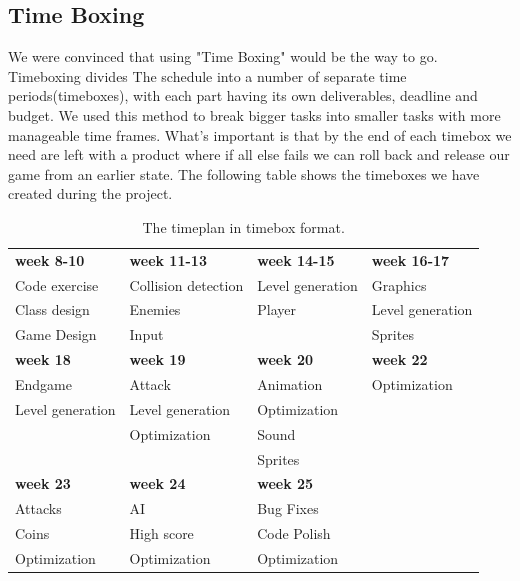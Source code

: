 \subsection*{Time Boxing} %
We were convinced that using "Time Boxing" would be the way to go. Timeboxing divides The schedule into a number of separate time periods(timeboxes), with each part having its own deliverables, deadline and budget. We used this method to break bigger tasks into smaller tasks with more manageable time frames. What's important is that by the end of each timebox we need are left with a product where if all else fails we can roll back and release our game from an earlier state. The following table shows the timeboxes we have created during the project.
\begin{table}[h]
\begin{tabular}{llll}
  \rowcolor[HTML]{BBDAFF}
  \textbf{week 8-10}	& \textbf{week 11-13}	& \textbf{week 14-15}	& \textbf{week 16-17}	\\
  Code exercise			& Collision detection	& Level generation		& Graphics				\\
  Class design			& Enemies				& Player				& Level generation		\\
  Game Design			& Input					& 						& Sprites				\\
  \rowcolor[HTML]{BBDAFF} 
  \textbf{week 18}		& \textbf{week 19}		& \textbf{week 20}		& \textbf{week 22}		\\
  Endgame				& Attack				& Animation				& Optimization			\\
  Level generation		& Level generation		& Optimization			& 						\\
  						& Optimization			& Sound					& 						\\
  						& 						& Sprites 				& 						\\
  \rowcolor[HTML]{BBDAFF}
  \textbf{week 23}		& \textbf{week 24}		& \textbf{week 25}		& 						\\
  Attacks				& AI					& Bug Fixes				& 						\\
  Coins					& High score			& Code Polish			& 						\\
  Optimization			& Optimization			& Optimization			& 						\\
\end{tabular}
\caption{The timeplan in timebox format.}
\end{table}

